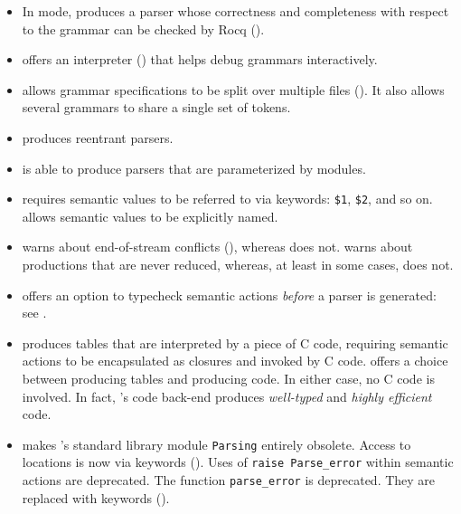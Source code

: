 \documentclass[onecolumn,11pt,nocopyrightspace,preprint]{sigplanconf}
\begin{document}
\begin{itemize}
\item In \orocq mode, \menhir produces a parser whose correctness and
  completeness with respect to the grammar can be checked by Rocq ().

\item \menhir offers an interpreter () that helps debug
      grammars interactively.

\item \menhir allows grammar specifications to be split over multiple files ().
      It also allows several grammars to share a single set of tokens.

\item \menhir produces reentrant parsers.

\item \menhir is able to produce parsers that are parameterized by \ocaml
      modules.

\item \ocamlyacc requires semantic values to be referred to via keywords: \verb+$1+,
      \verb+$2+, and so on. \menhir allows semantic values to be explicitly named.

\item \menhir warns about end-of-stream conflicts (), whereas
      \ocamlyacc does not. \menhir warns about productions that are never
      reduced, whereas, at least in some cases, \ocamlyacc does not.

\item \menhir offers an option to typecheck semantic actions \emph{before}
      a parser is generated: see \oinfer.

\item \ocamlyacc produces tables that are interpreted by a piece of C code,
      requiring semantic actions to be encapsulated as \ocaml closures and
      invoked by C code. \menhir offers a choice between producing tables
      and producing code. In either case, no C code is involved.
      In fact, \menhir's code back-end produces \emph{well-typed} and
      \emph{highly efficient} code.

\item \menhir makes \ocaml's standard library module \texttt{Parsing}
      entirely obsolete. Access to locations is now via keywords
      ().  Uses of \verb+raise Parse_error+ within
      semantic actions are deprecated.  The function \verb+parse_error+ is
      deprecated. They are replaced with keywords ().


\end{itemize}
\end{document}
